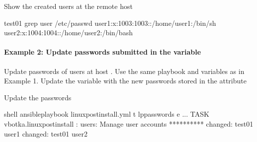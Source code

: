 \documentclass[letterpaper,10pt,english]{sphinxmanual}
\begin{document}
Show the created users at the remote host

%
\begin{sphinxVerbatim}[commandchars=\\\{\}]
test\PYGZus{}01\PYGZgt{} grep user /etc/passwd
user1:x:1003:1003::/home/user1:/bin/sh
user2:x:1004:1004::/home/user2:/bin/bash
\end{sphinxVerbatim}
\sphinxresetverbatimhllines


\paragraph{Example 2: Update passwords submitted in the variable}
\label{\detokenize{guide:example-2-update-passwords-submitted-in-the-variable}}\label{\detokenize{guide:ug-task-passwords-passwordstore-ex2}}
Update passwords of users at host . Use the same playbook and
variables as in Example 1. Update the variable  with the new
passwords stored in the attribute 

%
\begin{sphinxVerbatim}[commandchars=\\\{\}]
       
       
\end{sphinxVerbatim}
\sphinxresetverbatimhllines

Update the passwords

%
\begin{sphinxVerbatim}[commandchars=\\\{\}]
shell\PYGZgt{} ansible\PYGZhy{}playbook linux\PYGZhy{}postinstall.yml \PYGZhy{}t lp\PYGZus{}passwords 
                                    \PYGZhy{}e 
...
TASK \PYG{o}{[}vbotka.linux\PYGZus{}postinstall : users: Manage user accounts\PYG{o}{]} **********
changed: \PYG{o}{[}test\PYGZus{}01\PYG{o}{]} \PYGZgt{} user1
changed: \PYG{o}{[}test\PYGZus{}01\PYG{o}{]} \PYGZgt{} user2
\end{sphinxVerbatim}
\sphinxresetverbatimhllines
\end{document}
